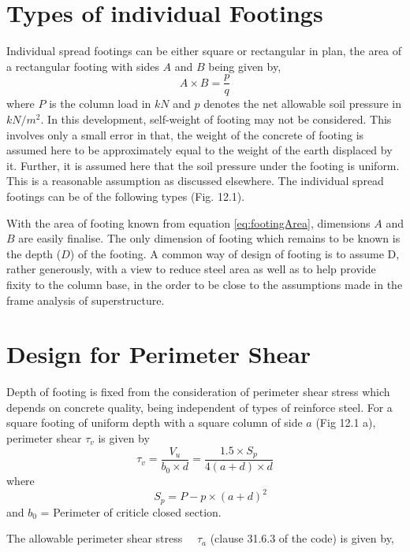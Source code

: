 \section{Types of individual Footings} Individual spread footings can be
either square or rectangular in plan, the area of a rectangular footing with
sides $A$ and $B$ being given by,
\begin{equation}
\label{eq:footingArea}
A \times B = \frac{p}{q}
\end{equation}
where $P$ is the column load in $kN$ and $p$ denotes the net allowable soil
pressure in $kN/m^2$. In this development, self-weight of footing may not
be considered. This involves only a small error in that, the weight of the
concrete of footing is assumed here to be approximately equal to the weight
of the earth displaced by it. Further, it is assumed here that the soil
pressure under the footing is uniform. This is a reasonable assumption as
discussed elsewhere. The individual spread footings can be of the following
types (Fig.  12.1).

With the area of footing known from equation \ref{eq:footingArea},
dimensions $A$ and $B$ are easily finalise.  The only dimension of footing
which remains to be known is the depth ($D$) of the footing.  A common way
of design of footing is to assume D, rather generously, with a view to
reduce steel area as well as to help provide fixity to the column base, in
the order to be close to the assumptions made in the frame analysis of
superstructure.

\section{Design for Perimeter Shear} Depth of footing is fixed from the
consideration of perimeter shear stress which depends on concrete quality,
being independent of types of reinforce steel. For a square footing of
uniform depth with a square column of side $a$ (Fig 12.1 a), perimeter shear
$\tau_{v}$ is given by
\begin{equation}
\label{eq:perimeterShearStress}
\tau_{v} = \frac{V_{u}} {{b_{0}} \times d} 
=\frac{1.5 \times S_{p}} {4(a + d) \times d} 
\end{equation}
where 
\begin{equation}
\label{eq:perimeterShearForce}
\quad S_{p} = P - p \times (a + d)^2
\end{equation}
and $b_0$ = Perimeter of criticle closed section.

The allowable perimeter shear stress $\quad{\tau_{a}}$ (clause 31.6.3 of
the code) is given by,


